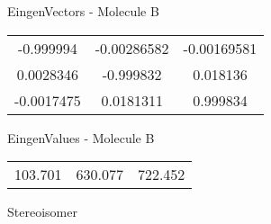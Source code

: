 \begin{multicols}{2}
\begin{center}
\vtab
 EingenVectors - Molecule B     \\
\vtab
\begin{tabular}{|c c c|}
-0.999994	 & 	-0.00286582	 & 	-0.00169581	 \\
0.0028346	 & 	-0.999832	 & 	0.018136	 \\
-0.0017475	 & 	0.0181311	 & 	0.999834
\end{tabular}

\vtab
 EingenValues - Molecule B     \\
\vtab
\begin{tabular}{|c c c|}
103.701	 & 	630.077	 & 	722.452	 \\
\end{tabular}

\end{center}
\end{multicols}
\begin{center}
\vtab
\vtab
\textcolor{NavyBlue}{\Large Stereoisomer}
\end{center}

 \newpage

